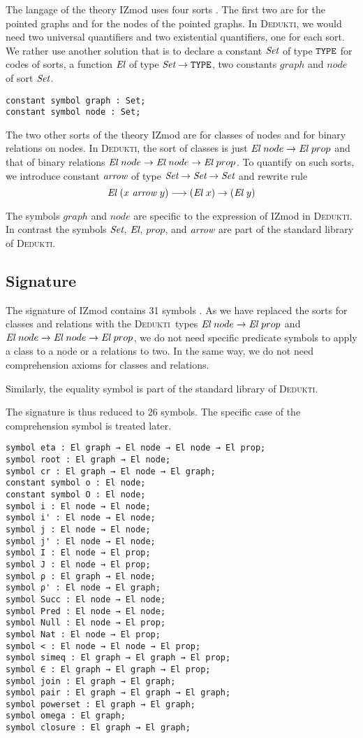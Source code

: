 \documentclass[submission,copyright,creativecommons]{eptcs}
\def\Type{\mbox{\tt TYPE}}
\def\ra{\rightarrow}
\def\lra{\longrightarrow}
\def\Set{\mbox{\it Set}}
\def\El{{\mbox{\it El}}}
\newcommand{\dedukti}{\textsc{Dedukti}}
\def\arr{{\mbox{\it arrow}}}
\begin{document}
The langage of the theory IZmod uses four sorts \cite[see Section 3.2]{zermodulo}. The first two are for
the pointed graphs and for the nodes of the pointed graphs.  In
\dedukti, we would need two universal quantifiers and two
existential quantifiers, one for each sort.  We rather use another
solution \cite{theoryU} that is to declare a constant $\Set$ of type
$\Type$ for codes of sorts, a function $\El$ of type $\Set \ra \Type$,
two constants $graph$ and $node$ of sort $\Set$.

\begin{lstlisting}
constant symbol graph : Set;
constant symbol node : Set;
\end{lstlisting}

The two other sorts of the theory IZmod are for classes of nodes and
for binary relations on nodes.  In \dedukti, the sort of classes is
just $\El~node \ra \El~prop$ and that of binary relations
$\El~node \ra \El~node \ra \El~prop$. To quantify on such sorts, we introduce constant $\arr $ of type
$\Set \ra \Set \ra \Set$ and rewrite rule
$$\El~(x~\arr~y) \lra (\El~x) \ra (\El~y)$$

The symbols $graph$ and $node$ are specific to the
expression of IZmod in \dedukti. In contrast the symbols $\Set$,
$\El$, $prop$, and $\arr$ are part of the standard library of 
\dedukti.

\subsection{Signature}

The signature of IZmod contains 31 symbols \cite[see Table 2]{zermodulo}. As we have replaced the
sorts for classes and relations with the \dedukti \ types
$\El~node \ra \El~prop$ and $\El~node \ra \El~node \ra \El~prop$, we do not need specific predicate symbols to apply a class to a node or a relations to two. In the same way, we do not need comprehension axioms for classes and relations. 

Similarly, the equality symbol is part of the standard library of \dedukti.

The signature is thus reduced to 26 symbols. The specific case of the comprehension symbol is treated later.

\begin{lstlisting}
symbol eta : El graph → El node → El node → El prop;
symbol root : El graph → El node;
symbol cr : El graph → El node → El graph;
constant symbol o : El node;
constant symbol O : El node;
symbol i : El node → El node;
symbol i' : El node → El node;
symbol j : El node → El node;
symbol j' : El node → El node;
symbol I : El node → El prop;
symbol J : El node → El prop;
symbol ρ : El graph → El node;
symbol ρ' : El node → El graph;
symbol Succ : El node → El node;
symbol Pred : El node → El node;
symbol Null : El node → El prop;
symbol Nat : El node → El prop;
symbol < : El node → El node → El prop;
symbol simeq : El graph → El graph → El prop;
symbol ∈ : El graph → El graph → El prop;
symbol join : El graph → El graph;
symbol pair : El graph → El graph → El graph;
symbol powerset : El graph → El graph;
symbol omega : El graph;
symbol closure : El graph → El graph;
\end{lstlisting}
\end{document}
